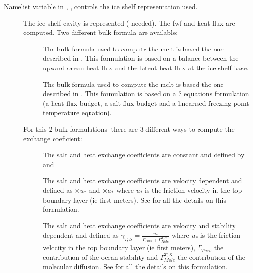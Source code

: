 \documentclass[../tex_main/NEMO_manual]{subfiles}
\begin{document}
Namelist variable in , , controls the ice shelf representation used. 
\begin{description}
\item[]
  The ice shelf cavity is represented ( needed).
  The fwf and heat flux are computed.
  Two different bulk formula are available:
	\begin{description}
	\item[]
     The bulk formula used to compute the melt is based the one described in \citet{Hunter2006}.
     This formulation is based on a balance between the upward ocean heat flux and
     the latent heat flux at the ice shelf base.
	\item[]
     The bulk formula used to compute the melt is based the one described in \citet{Jenkins1991}.
     This formulation is based on a 3 equations formulation
     (a heat flux budget, a salt flux budget and a linearised freezing point temperature equation).
	\end{description}
   For this 2 bulk formulations, there are 3 different ways to compute the exchange coeficient:
	\begin{description}
   \item[]
     The salt and heat exchange coefficients are constant and defined by  and 
	\item[]
     The salt and heat exchange coefficients are velocity dependent and defined as
     $ \times u_{*}$ and $ \times u_{*}$ where
     $u_{*}$ is the friction velocity in the top boundary layer (ie first  meters).
     See \citet{Jenkins2010} for all the details on this formulation.
	\item[]
     The salt and heat exchange coefficients are velocity and stability dependent and defined as
     $\gamma_{T,S} = \frac{u_{*}}{\Gamma_{Turb} + \Gamma^{T,S}_{Mole}}$ where
     $u_{*}$ is the friction velocity in the top boundary layer (ie first  meters),
     $\Gamma_{Turb}$ the contribution of the ocean stability and
     $\Gamma^{T,S}_{Mole}$ the contribution of the molecular diffusion.
     See \citet{Holland1999} for all the details on this formulation.

\end{description}
\end{description}
\end{document}
